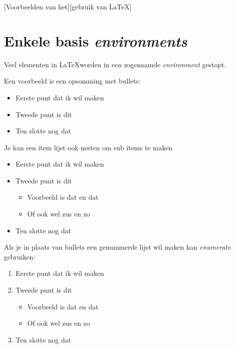 [Voorbeelden van het][gebruik van \LaTeX]
\label{ch:voorbeelden}

\section{Enkele basis \emph{environments}}
\label{sec:basis_environment}

Veel elementen in \LaTeX worden in een zogenaamde \emph{environment} gestopt.

Een voorbeeld is een opsomming met bullets:


\begin{itemize}
    \item Eerste punt dat ik wil maken
    \item Tweede punt is dit
    \item Ten slotte nog dat
\end{itemize}

Je kan een item lijst ook nesten om sub items te maken

\begin{itemize}
    \item Eerste punt dat ik wil maken
    \item Tweede punt is dit
    \begin{itemize}
        \item Voorbeeld is dat en dat
        \item Of ook wel zus en zo
    \end{itemize}
    \item Ten slotte nog dat
\end{itemize}

Als je in plaats van bullets een genummerde lijst wil maken kan \emph{enumerate} gebruiken:

\begin{enumerate}
    \item Eerste punt dat ik wil maken
    \item Tweede punt is dit
    \begin{itemize}
        \item Voorbeeld is dat en dat
        \item Of ook wel zus en zo
    \end{itemize}
    \item Ten slotte nog dat
\end{enumerate}


